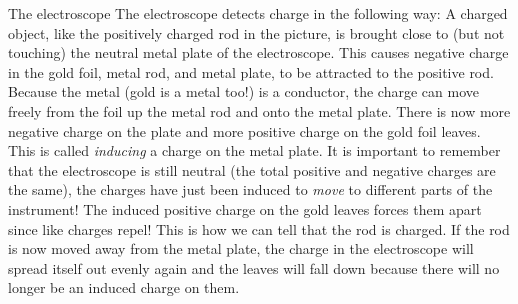 \begin{i_experiment}{The electroscope}
        \label{m38781*id200552}The electroscope detects charge in the following way: A charged object, like the positively charged rod in the picture, is brought close to (but not touching) the neutral metal plate of the electroscope. This causes negative charge in the gold foil, metal rod, and metal plate, to be attracted to the positive rod. Because the metal (gold is a metal too!) is a conductor, the charge can move freely from the foil up the metal rod and onto the metal plate. There is now more negative charge on the plate and more positive charge on the gold foil leaves. This is called \textsl{inducing} a charge on the metal plate. It is important to remember that the electroscope is still neutral (the total positive and negative charges are the same), the charges have just been induced to \textsl{move} to different parts of the instrument! The induced positive charge on the gold leaves forces them apart since like charges repel! This is how we can tell that the rod is charged. If the rod is now moved away from the metal plate, the charge in the electroscope will spread itself out evenly again and the leaves will fall down because there will no longer be an induced charge on them.\par 
        \label{m38781*uid12}


\end{i_experiment}
